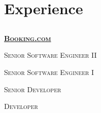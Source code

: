 \documentclass{article}
\begin{document}
\section{Experience}
\subsection[Booking.com]{}
{\raggedright{\textsc{\textbf{\href{https://www.booking.com/}{Booking.com}}}}} \hfill {}

{\raggedright{\textsc{Senior Software Engineer II}}} \hfill {}

{\raggedright{\textsc{Senior Software Engineer I}}} \hfill {}

{\raggedright{\textsc{Senior Developer}}} \hfill {}

{\raggedright{\textsc{Developer}}} \hfill {}
\end{document}
